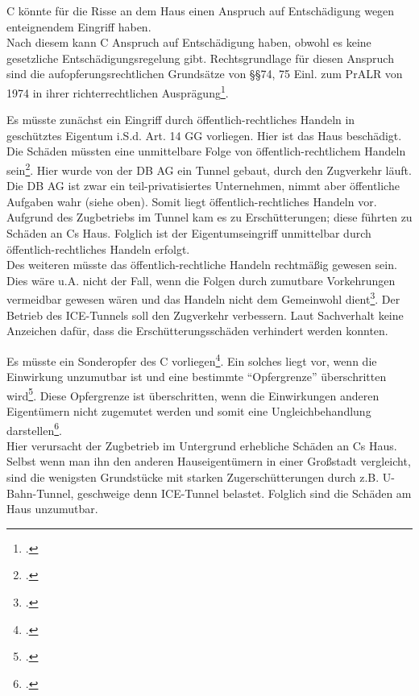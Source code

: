 \documentclass[widefront, ngerman]{jura}
\begin{document}
C könnte für die Risse an dem Haus einen Anspruch auf Entschädigung wegen enteignendem Eingriff haben.\\
Nach diesem kann C Anspruch auf Entschädigung haben, obwohl es keine gesetzliche Entschädigungsregelung gibt. Rechtsgrundlage für diesen Anspruch sind die aufopferungsrechtlichen Grundsätze von §§74, 75 Einl. zum PrALR von 1974 in ihrer richterrechtlichen Ausprägung\footcite[Rn 1163]{detterbeckVerwR}.

Es müsste zunächst ein Eingriff durch öffentlich-rechtliches Handeln in geschütztes Eigentum i.S.d. Art. 14 GG vorliegen. Hier ist das Haus beschädigt.\\
Die Schäden müssten eine unmittelbare Folge von öffentlich-rechtlichem Handeln sein\footcite[Rn 1165]{detterbeckVerwR}. Hier wurde von der DB AG ein Tunnel gebaut, durch den Zugverkehr läuft. Die DB AG ist zwar ein teil-privatisiertes Unternehmen, nimmt aber öffentliche Aufgaben wahr (siehe oben). Somit liegt öffentlich-rechtliches Handeln vor.\\
Aufgrund des Zugbetriebs im Tunnel kam es zu Erschütterungen; diese führten zu Schäden an Cs Haus. Folglich ist der Eigentumseingriff unmittelbar durch öffentlich-rechtliches Handeln erfolgt.\\
Des weiteren müsste das öffentlich-rechtliche Handeln rechtmäßig gewesen sein. Dies wäre u.A. nicht der Fall, wenn die Folgen durch zumutbare Vorkehrungen vermeidbar gewesen wären und das Handeln nicht dem Gemeinwohl dient\footcite[Rn 1167, 1169]{detterbeckVerwR}. Der Betrieb des ICE-Tunnels soll den Zugverkehr verbessern. Laut Sachverhalt keine Anzeichen dafür, dass die Erschütterungsschäden verhindert werden konnten.

Es müsste ein Sonderopfer des C vorliegen\footcite[S. 276ff.]{Ossenbuehl}. Ein solches liegt vor, wenn die Einwirkung unzumutbar ist und eine bestimmte "`Opfergrenze"' überschritten wird\footcite[S. 277]{Ossenbuehl}. Diese Opfergrenze ist überschritten, wenn die Einwirkungen anderen Eigentümern nicht zugemutet werden und somit eine Ungleichbehandlung darstellen\footcite[§17 Rn 65]{DetterbeckStaatshaftung}.\\
Hier verursacht der Zugbetrieb im Untergrund erhebliche Schäden an Cs Haus. Selbst wenn man ihn den anderen Hauseigentümern in einer Großstadt vergleicht, sind die wenigsten Grundstücke mit starken Zugerschütterungen durch z.B. U-Bahn-Tunnel, geschweige denn ICE-Tunnel belastet. Folglich sind die Schäden am Haus unzumutbar.
\end{document}
